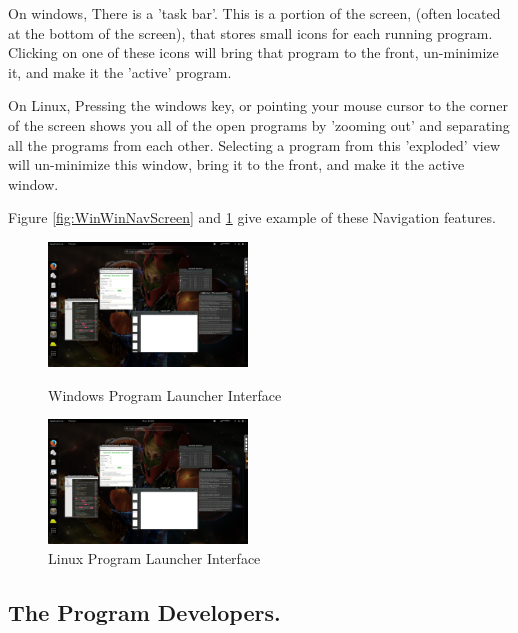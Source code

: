\documentclass[a4paper]{report}
\begin{document}
On windows, There is a 'task bar'. This is a portion of the screen, (often located at the bottom of the screen), that stores small icons for each running program. Clicking on one of these icons will bring that program to the front, un-minimize it, and make it the 'active' program.

On Linux, Pressing the windows key, or pointing your mouse cursor to the corner of the screen shows you all of the open programs by 'zooming out' and separating all the programs from each other. Selecting a program from this 'exploded' view will un-minimize this window, bring it to the front, and make it the active window. 

Figure \ref{fig:WinWinNavScreen} and \ref{fig:LinWinNavScreen} give example of these Navigation features.

\begin{figure}[ht]
\centering
\begin{minipage}{.5\textwidth}
  \centering
  \includegraphics[width=200px]{images/Linux_Window_Navigation_Screenshot}
  \caption{Windows Program Launcher Interface}
  \label{fig:WinWinNavScreen}
\end{minipage}%
\begin{minipage}{.5\textwidth}
  \centering
  \includegraphics[width=200px]{images/Linux_Window_Navigation_Screenshot}
  \caption{Linux Program Launcher Interface}
  \label{fig:LinWinNavScreen}
\end{minipage} 
\end{figure}


\clearpage
\subsection*{The Program Developers.}
\end{document}
